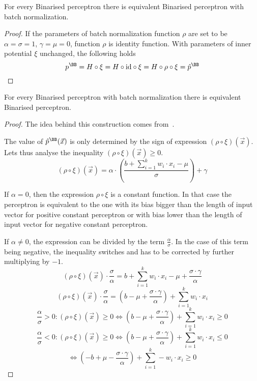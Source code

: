 \begin{lemma}{For every Binarised perceptron there is equivalent Binarised perceptron with batch normalization.}
\begin{proof}
If the parameters of batch normalization function $\rho$ are set to be
$\alpha=\sigma=1$, $\gamma=\mu=0$, function $\rho$ is identity function.
With parameters of inner potential $\xi$ unchanged, the following holds
\begin{equation*}
	p^\BB = H \circ \xi = H \circ \text{id} \circ \xi = H\circ\rho\circ\xi = \hat{p}^\BB
\end{equation*}
\end{proof}
\end{lemma}

\begin{lemma}For every Binarised perceptron with batch normalization there is equivalent Binarised perceptron.\label{lem:batch_perceptron}
\begin{proof}
The idea behind this construction comes from~\cite{zhang2021bdd4bnn}.

The value of $\hat{p}^\BB(\vec x)$ is only determined by the sign of expression
$(\rho \circ \xi)(\vec x)$. Lets thus analyse the inequality
$(\rho\circ\xi)(\vec x) \geq 0$.
\begin{equation*}
	(\rho \circ \xi)(\vec x) = \alpha\cdot \left(\frac{
		b + \sum_{i=1}^k w_i\cdot x_i
	-\mu}{\sigma}\right) + \gamma
\end{equation*}

If $\alpha = 0$, then the expression $\rho\circ\xi$ is a constant function. In that case
the perceptron is equivalent to the one with its bias bigger than the length
of input vector for positive constant perceptron or with bias lower than the length
of input vector for negative constant perceptron.

If $\alpha \neq 0$, the expression can be divided by the term $\frac{\alpha}{\sigma}$.
In the case of this term being negative, the inequality switches and has to be corrected
by further multiplying by $-1$.
\begin{equation*}
	(\rho \circ \xi)(\vec x) \cdot \frac{\sigma}{\alpha} =
	b + \sum_{i=1}^k w_i\cdot x_i -\mu + \frac{\sigma\cdot \gamma}{\alpha}
\end{equation*}
\begin{equation*}
	(\rho \circ \xi)(\vec x) \cdot \frac{\sigma}{\alpha} =
	(b -\mu + \frac{\sigma\cdot \gamma}{\alpha}) + \sum_{i=1}^k w_i\cdot x_i
\end{equation*}
\begin{equation*}
	\frac{\alpha}{\sigma} > 0 :
		(\rho\circ\xi)(\vec x)\geq 0 \iff 
		(b -\mu + \frac{\sigma\cdot \gamma}{\alpha}) + \sum_{i=1}^k w_i\cdot x_i \geq 0
\end{equation*}
\begin{equation*}
	\frac{\alpha}{\sigma} < 0 :
		(\rho\circ\xi)(\vec x)\geq 0 \iff 
		(b -\mu + \frac{\sigma\cdot \gamma}{\alpha}) + \sum_{i=1}^k w_i\cdot x_i \leq 0
\end{equation*}
\begin{equation*}
	\iff (-b +\mu - \frac{\sigma\cdot \gamma}{\alpha}) + \sum_{i=1}^k -w_i\cdot x_i \geq 0
\end{equation*}


\end{proof}
\end{lemma}
